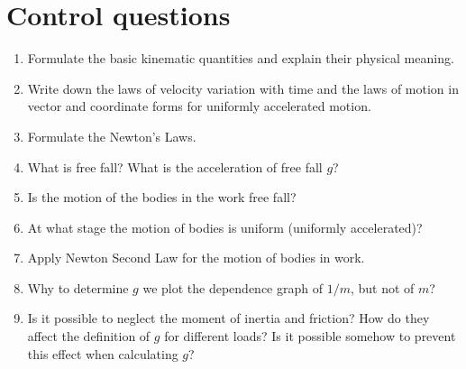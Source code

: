 \documentclass{LabWorkEng}
\begin{document}
\section*{Control questions}
\begin{enumerate}[label*=\arabic*.]
	\item Formulate the basic kinematic quantities and explain their physical meaning.
	\item Write down the laws of velocity variation with time and the laws of motion in vector and coordinate forms for uniformly accelerated motion.
	\item Formulate the Newton's Laws.
	\item What is free fall? What is the acceleration of free fall $g$?
	\item Is the motion of the bodies in the work free fall?
	\item At what stage the motion of bodies is uniform (uniformly accelerated)?
	\item Apply Newton Second Law for the motion of bodies in work.
	\item Why to determine $g$ we plot the dependence graph of $1/m$, but not of $m$?
	\item Is it possible to neglect the moment of inertia and friction? How do they affect the definition of $g$ for different loads? Is it possible somehow to prevent this effect when calculating $g$?
\end{enumerate}
\end{document}
